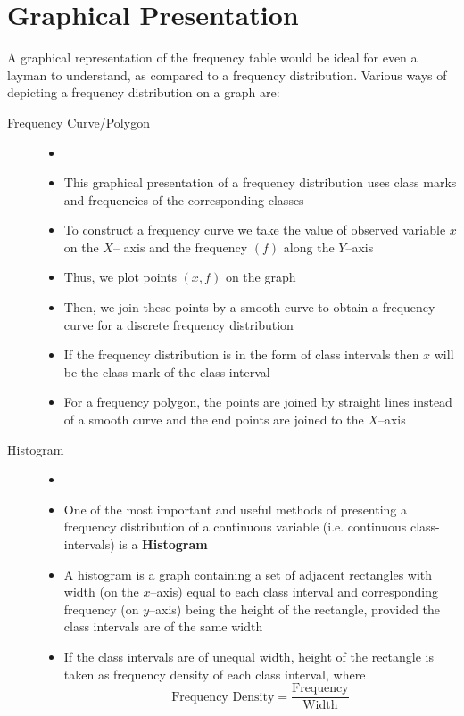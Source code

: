 \documentclass[
10pt, %
a4paper, %
]{report}
\begin{document}
\section*{Graphical Presentation}
A graphical representation of the frequency
table would be ideal for even a layman to
understand, as compared to a frequency distribution. Various ways of
depicting a frequency distribution on a graph are:
\begin{description}
\item[Frequency Curve/Polygon]
\begin{itemize}
\item []
\item  This graphical presentation of a frequency
distribution uses class marks and frequencies of
the corresponding classes
\item To construct a frequency curve we take the value of observed variable \(x\) on the \(X\)– axis and the frequency \((f)\) along the \(Y\)–axis
\item Thus, we plot points \((x, f)\) on the graph
\item Then, we join these points by a smooth curve to obtain a frequency curve for a discrete
frequency distribution
\item If the frequency distribution is in the form of class intervals then \(x\) will be the class mark of the class interval
\item For a frequency polygon, the points are joined by straight lines instead of a smooth curve and the end points are joined to the \(X\)–axis
\end{itemize}
\item[Histogram]
\begin{itemize}
\item[]
\item One of the most important and useful methods of presenting a frequency distribution of a continuous variable (i.e. continuous class-
intervals) is a \textbf{Histogram}
\item A histogram is a graph containing a set of
adjacent rectangles with width (on the \(x\)–axis) equal to each class interval and corresponding frequency (on \(y\)–axis) being the height of the rectangle, provided the class intervals are of the same width
\item If the class intervals are of unequal width, height of the rectangle is taken as frequency density of each class interval, where
\[
\text{Frequency Density} = \dfrac{\text{Frequency}}{\text{Width}}
\]
\end{itemize}

\end{description}
\end{document}
